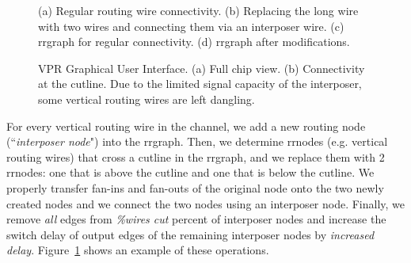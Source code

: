 \documentclass[journal]{IEEEtran}
\begin{document}
\begin{figure}[!t]
\caption{(a) Regular routing wire connectivity. (b) Replacing the long wire with two wires and connecting them via an interposer wire. (c) rrgraph for regular connectivity. (d) rrgraph after modifications.}
\label{fig:rrgraph_ops}
\end{figure}

\begin{figure}[!thpb]
\caption{VPR Graphical User Interface. (a) Full chip view. (b) Connectivity at the cutline. Due to the limited signal capacity of the interposer, some vertical routing wires are left dangling.}
\label{fig:vpr_interposer_gui}
\end{figure}

For every vertical routing wire in the channel, we add a new routing node (``\textit{interposer node}") into the rrgraph. Then, we determine rrnodes (e.g. vertical routing wires) that cross a cutline in the rrgraph, and we replace them with 2 rrnodes: one that is above the cutline and one that is below the cutline. We properly transfer fan-ins and fan-outs of the original node onto the two newly created nodes and we connect the two nodes using an interposer node. Finally, we remove \textit{all} edges from \textit{\%wires cut} percent of interposer nodes and increase the switch delay of output edges of the remaining interposer nodes by \textit{increased delay}. Figure~\ref{fig:rrgraph_ops} shows an example of these operations.
\end{document}
